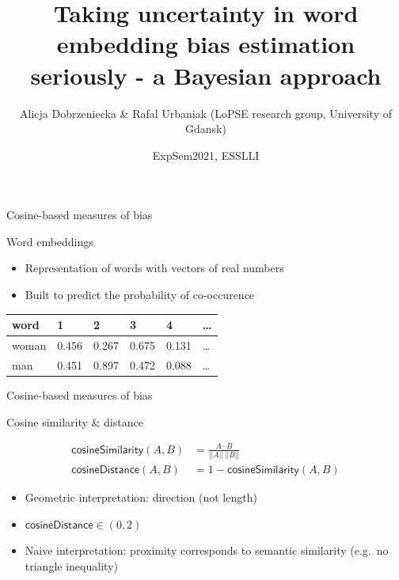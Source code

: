 \documentclass[
  10pt,
  ignorenonframetext,
  x11names, dvipsnames, bibspacing,natbib]{beamer}
\title{\large Taking uncertainty in word embedding bias estimation
seriously - a Bayesian approach}
\author{Alicja Dobrzeniecka \& Rafal Urbaniak
\footnotesize \newline (LoPSE research group, University of Gdansk)}
\date{ExpSem2021, ESSLLI}
\begin{document}
\frame{\titlepage}

\begin{frame}{Cosine-based measures of bias}
\protect\hypertarget{cosine-based-measures-of-bias}{}
\begin{block}{Word embeddings}
\protect\hypertarget{word-embeddings}{}
\begin{itemize}
\item
  Representation of words with vectors of real numbers
\item
  Built to predict the probability of co-occurence
\end{itemize}

\begin{longtable}[]{@{}llllll@{}}
\toprule
word & 1 & 2 & 3 & 4 & \ldots{} \\
\midrule
\endhead
woman & 0.456 & 0.267 & 0.675 & 0.131 & \ldots{} \\
man & 0.451 & 0.897 & 0.472 & 0.088 & \ldots{} \\
\bottomrule
\end{longtable}
\end{block}
\end{frame}

\begin{frame}{Cosine-based measures of bias}
\protect\hypertarget{cosine-based-measures-of-bias-1}{}
\begin{block}{Cosine similarity \& distance}
\protect\hypertarget{cosine-similarity-distance}{}
\vspace{-4mm}

\begin{align} \tag{Sim}
\mathsf{cosineSimilarity}(A,B) & = \frac{A \cdot B}{\vert \vert A \vert \vert \,\vert \vert B \vert \vert}
\\
\tag{Distance}
\mathsf{cosineDistance}(A,B) &  = 1 - \mathsf{cosineSimilarity}(A,B)
\end{align}

\begin{itemize}
\item
  Geometric interpretation: direction (not length)
\item
  \(\mathsf{cosineDistance}\in (0, 2)\)
\item
  Naive interpretation: proximity corresponds to semantic similarity
  (e.g.~no triangle inequality)
\end{itemize}
\end{block}
\end{frame}
\end{document}
